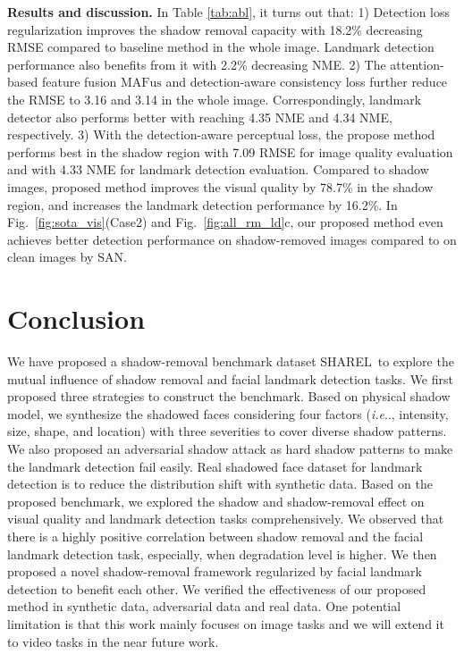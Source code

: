 \documentclass[10pt,twocolumn,letterpaper]{article}
\makeatletter
\def\ourmethod{{SHAREL}~}
\newcommand{\figref}[1]{Fig.~\ref{#1}}
\DeclareRobustCommand\onedot{\futurelet\@let@token\@onedot}
\def\@onedot{\ifx\@let@token.\else.\null\fi\xspace}
\def\ie{\emph{i.e}\onedot} \def\Ie{\emph{I.e}\onedot}
\renewcommand{\paragraph}[1]{\vspace{1.25mm}\noindent\textbf{#1}}
\makeatother
\begin{document}
\paragraph{Results and discussion.} 
In Table \ref{tab:abl}, it turns out that: 1) Detection loss regularization improves the shadow removal capacity with 18.2\% decreasing RMSE compared to baseline method in the whole image. Landmark detection performance also benefits from it with 2.2\% decreasing NME. 2) The attention-based feature fusion $\text{MAFus}$ and detection-aware consistency loss further reduce the RMSE to 3.16 and 3.14 in the whole image. Correspondingly, landmark detector also performs better with reaching 4.35 NME and 4.34 NME, respectively. 3) With the detection-aware perceptual loss, the propose method performs best in the shadow region with 7.09 RMSE for image quality evaluation and with 4.33 NME for landmark detection evaluation. Compared to shadow images, proposed method improves the visual quality by 78.7\% in the shadow region, and increases the landmark detection performance by 16.2\%. In \figref{fig:sota_vis}(Case2) and \figref{fig:all_rm_ld}c, our proposed method even achieves better detection performance on shadow-removed images compared to on clean images by SAN. 
%

\section{Conclusion}
We have proposed a shadow-removal benchmark dataset \ourmethod to explore the mutual influence of shadow removal and facial landmark detection tasks. We first proposed three strategies to construct the benchmark. Based on physical shadow model, we synthesize the shadowed faces considering four factors (\ie, intensity, size, shape, and location) with three severities to cover diverse shadow patterns. We also proposed an adversarial shadow attack as hard shadow patterns to make the landmark detection fail easily. Real shadowed face dataset for landmark detection is to reduce the distribution shift with synthetic data. Based on the proposed benchmark, we explored the shadow and shadow-removal effect on visual quality and landmark detection tasks comprehensively. We observed that there is a highly positive correlation between shadow removal and the facial landmark detection task, especially, when degradation level is higher. We then proposed a novel shadow-removal framework regularized by facial landmark detection to benefit each other. We verified the effectiveness of our proposed method in synthetic data, adversarial data and real data. One potential limitation is that this work mainly focuses on image tasks and we will extend it to video tasks in the near future work.
\end{document}
